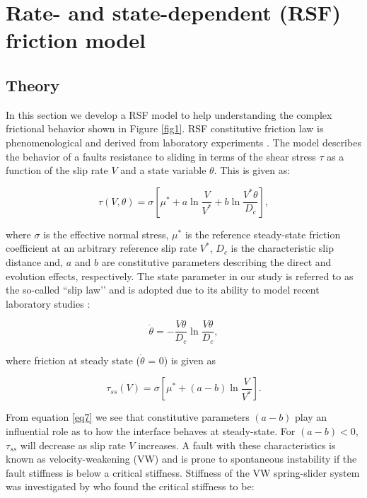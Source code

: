 \documentclass[draft]{agujournal2019}
\begin{document}
\section{Rate- and state-dependent (RSF) friction model}
\subsection{Theory}
\label{Theory}

In this section we develop a RSF model to help understanding the complex frictional behavior shown in Figure \ref{fig1}.  RSF constitutive friction law is phenomenological and derived from laboratory experiments \cite{Dieterich1979}.  The model describes the behavior of a faults resistance to sliding in terms of the shear stress $\tau$ as a function of the slip rate $V$ and a state variable $\theta$. This is given as:

\begin{equation}
\label{eq5}
\tau \left( V,\theta \right) = \sigma \left[\mu^{*} + a \ln\frac{V}{V^{*}} + b \ln\frac{V^{*}\theta}{D_{c}}\right],
\end{equation}   

\noindent where $\sigma$ is the effective normal stress, $\mu^{*}$ is the reference steady-state friction coefficient at an arbitrary reference slip rate $V^{*}$, $D_{c}$ is the characteristic slip distance and, $a$ and $b$ are constitutive parameters describing the direct and evolution effects, respectively.  The state parameter in our study is referred to as the so-called ``slip law’’ and is adopted due to its ability to model recent laboratory studies \cite{Bhattacharya2015, Kaneko2011, Kaneko2016}:

\begin{equation}
\label{eq6}
\dot{\theta} = - \frac{V\theta}{D_{c}}\ln\frac{V\theta}{D_{c}},
\end{equation}   

\noindent where friction at steady state ($\dot{\theta} $ = 0) is given as

\begin{equation}
\label{eq7}
\tau_{ss} \left( V \right) = \sigma \left[\mu^{*} + \left(a - b \right)\ln\frac{V}{V^{*}}\right].
\end{equation}   

\noindent From equation \eqref{eq7} we see that constitutive parameters $\left(a - b \right)$ play an influential role as to how the interface behaves at steady-state.  For $\left(a - b \right) < 0$, $\tau_{ss}$ will decrease as slip rate $V$ increases.  A fault with these characteristics is known as velocity-weakening (VW) and is prone to spontaneous instability if the fault stiffness is below a critical stiffness. Stiffness of the VW spring-slider system was investigated by  who found the critical stiffness to be:
\end{document}
